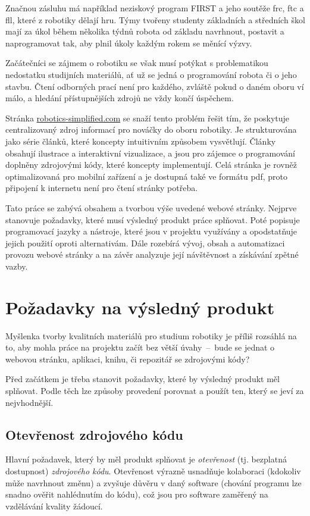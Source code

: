 \documentclass[a4paper, 12pt]{article}
\begin{document}
  Značnou zásluhu má například neziskový program FIRST a jeho soutěže \gls{frc}, \gls{ftc} a \gls{fll}, které z robotiky dělají hru. Týmy tvořeny studenty základních a středních škol mají za úkol během několika týdnů robota od základu navrhnout, postavit a naprogramovat tak, aby plnil úkoly každým rokem se měnící výzvy.

  Začátečníci se zájmem o robotiku se však musí potýkat s problematikou nedostatku studijních materiálů, ať už se jedná o programování robota či o jeho stavbu. Čtení odborných prací není pro každého, zvláště pokud o daném oboru ví málo, a hledání přístupnějších zdrojů ne vždy končí úspěchem.

  Stránka \url{robotics-simplified.com} se snaží tento problém řešit tím, že poskytuje centralizovaný zdroj informací pro nováčky do oboru robotiky. Je strukturována jako série článků, které koncepty intuitivním způsobem vysvětlují. Články obsahují ilustrace a interaktivní vizualizace, a jsou pro zájemce o programování doplněny zdrojovými kódy, které koncepty implementují. Celá stránka je rovněž optimalizovaná pro mobilní zařízení a je dostupná také ve formátu \gls{pdf}, proto připojení k internetu není pro čtení stránky potřeba.

  Tato práce se zabývá obsahem a tvorbou výše uvedené webové stránky. Nejprve stanovuje požadavky, které musí výsledný produkt práce splňovat. Poté popisuje programovací jazyky a nástroje, které jsou v projektu využívány a opodstatňuje jejich použití oproti alternativám. Dále rozebírá vývoj, obsah a automatizaci provozu webové stránky a na závěr analyzuje její návštěvnost a získávání zpětné vazby.

  \newpage

  \section{Požadavky na výsledný produkt} \label{sec:Požadavky na výsledný produkt}
  Myšlenka tvorby kvalitních materiálů pro studium robotiky je příliš rozsáhlá na to, aby mohla práce na projektu začít bez větší úvahy~--~bude se jednat o webovou stránku, aplikaci, knihu, či repozitář se zdrojovými kódy?

  Před začátkem je třeba stanovit požadavky, které by výsledný produkt měl splňovat. Podle těch lze způsoby provedení porovnat a použít ten, který se jeví za nejvhodnější.


  \subsection{Otevřenost zdrojového kódu}
  Hlavní požadavek, který by měl produkt splňovat je \emph{otevřenost} (tj. bezplatná dostupnost) \emph{zdrojového kódu}. Otevřenost výrazně usnadňuje kolaboraci (kdokoliv může navrhnout změnu) a zvyšuje důvěru v daný software (chování programu lze snadno ověřit nahlédnutím do kódu), což jsou pro software zaměřený na vzdělávání kvality žádoucí.
\end{document}
